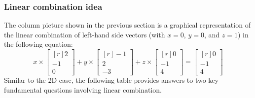 \documentclass[../main.tex]{subfiles}
\begin{document}
\subsubsection{Linear combination idea}
The column picture shown in the previous section is a graphical representation of the linear combination of left-hand side vectors (with $x = 0$, $y = 0$, and $z = 1$) in the following equation:
\[
    x \times
    \begin{bmatrix*}[r]
        2 \\
        -1 \\
        0
    \end{bmatrix*}
    +
    y \times
    \begin{bmatrix*}[r]
        -1 \\
        2 \\
        -3
    \end{bmatrix*}
    +
    z \times
    \begin{bmatrix*}[r]
        0 \\
        -1 \\
        4
    \end{bmatrix*}
    =
    \begin{bmatrix*}[r]
        0 \\
        -1 \\
        4
    \end{bmatrix*}
\]
Similar to the 2D case, the following table provides answers to two key fundamental questions involving linear combination.
\end{document}

